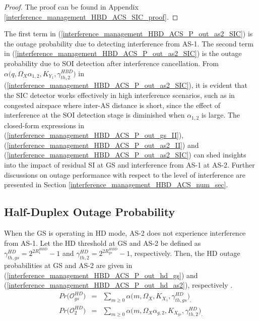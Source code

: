 \begin{proof}
The proof can be found in Appendix \ref{interference_management_HBD_ACS_SIC_proof}.
\end{proof}

The first term in (\ref{interference_management_HBD_ACS_P_out_as2_SIC}) is the outage probability due to detecting interference from AS-1. The second term in (\ref{interference_management_HBD_ACS_P_out_as2_SIC}) is the outage probability due to SOI detection after interference cancellation. From $\alpha\big(q,\Omega_X\alpha_{1,2},K_{Y_{1}},\gamma_{th,2}^{HBD}\big)$ in (\ref{interference_management_HBD_ACS_P_out_as2_SIC}), it is evident that the SIC detector works effectively in high interference scenarios, such as in congested airspace where inter-AS distance is short, since the effect of interference at the SOI detection stage is diminished when $\alpha_{1,2}$ is large. The closed-form expressions in (\ref{interference_management_HBD_ACS_P_out_gs_II}), (\ref{interference_management_HBD_ACS_P_out_as2_II}) and (\ref{interference_management_HBD_ACS_P_out_as2_SIC}) can shed insights into the impact of residual SI at GS and interference from AS-1 at AS-2. Further discussions on outage performance with respect to the level of interference are presented in Section \ref{interference_management_HBD_ACS_num_sec}. 

\subsection{Half-Duplex Outage Probability}
When the GS is operating in HD mode, AS-2 does not experience interference from AS-1. Let the HD threshold at GS and AS-2 be defined as $\gamma_{th,gs}^{HD} = 2^{2R_{1}^{HBD}}-1$ and $\gamma_{th,2}^{HD} = 2^{2R_{gs}^{HBD}}-1$, respectively. Then, the HD outage probabilities at GS and AS-2 are given in (\ref{interference_management_HBD_ACS_P_out_hd_gs}) and (\ref{interference_management_HBD_ACS_P_out_hd_as2}), respectively \cite[Table I]{rached2017unified}.
\begin{eqnarray} 
Pr\big(\mathcal{O}_{gs}^{HD}\big) & = & \sum_{m\geq0} \alpha\big(m,\Omega_X,K_{X_1},\gamma_{th,gs}^{HD}\big)_, \label{interference_management_HBD_ACS_P_out_hd_gs} \\
Pr\big(\mathcal{O}_{2}^{HD}\big) & = & \sum_{m\geq0} \alpha\big(m,\Omega_X\alpha_{g,2},K_{X_{gs}},\gamma_{th,2}^{HD}\big)_. \label{interference_management_HBD_ACS_P_out_hd_as2}
\end{eqnarray}

